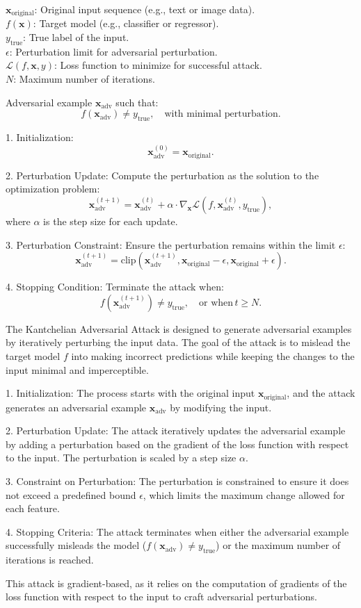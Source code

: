 $\mathbf{x}_{\text{original}}$: Original input sequence (e.g., text or image data). \\
$f(\mathbf{x})$: Target model (e.g., classifier or regressor). \\
$y_{\text{true}}$: True label of the input. \\
$\epsilon$: Perturbation limit for adversarial perturbation. \\
$\mathcal{L}(f, \mathbf{x}, y)$: Loss function to minimize for successful attack. \\
$N$: Maximum number of iterations.

Adversarial example $\mathbf{x}_{\text{adv}}$ such that:
\[
f(\mathbf{x}_{\text{adv}}) \neq y_{\text{true}}, \quad \text{with minimal perturbation}.
\]

1. Initialization:
   \[
   \mathbf{x}_{\text{adv}}^{(0)} = \mathbf{x}_{\text{original}}.
   \]

2. Perturbation Update:
   Compute the perturbation as the solution to the optimization problem:
   \[
   \mathbf{x}_{\text{adv}}^{(t+1)} = \mathbf{x}_{\text{adv}}^{(t)} + \alpha \cdot \nabla_{\mathbf{x}} \mathcal{L}(f, \mathbf{x}_{\text{adv}}^{(t)}, y_{\text{true}}),
   \]
   where $\alpha$ is the step size for each update.

3. Perturbation Constraint:
   Ensure the perturbation remains within the limit $\epsilon$:
   \[
   \mathbf{x}_{\text{adv}}^{(t+1)} = \text{clip}(\mathbf{x}_{\text{adv}}^{(t+1)}, \mathbf{x}_{\text{original}} - \epsilon, \mathbf{x}_{\text{original}} + \epsilon).
   \]

4. Stopping Condition:
   Terminate the attack when:
   \[
   f(\mathbf{x}_{\text{adv}}^{(t+1)}) \neq y_{\text{true}}, \quad \text{or when} \, t \geq N.
   \]

The Kantchelian Adversarial Attack is designed to generate adversarial examples by iteratively perturbing the input data. The goal of the attack is to mislead the target model $f$ into making incorrect predictions while keeping the changes to the input minimal and imperceptible.

1. Initialization: The process starts with the original input $\mathbf{x}_{\text{original}}$, and the attack generates an adversarial example $\mathbf{x}_{\text{adv}}$ by modifying the input.

2. Perturbation Update: The attack iteratively updates the adversarial example by adding a perturbation based on the gradient of the loss function with respect to the input. The perturbation is scaled by a step size $\alpha$.

3. Constraint on Perturbation: The perturbation is constrained to ensure it does not exceed a predefined bound $\epsilon$, which limits the maximum change allowed for each feature.

4. Stopping Criteria: The attack terminates when either the adversarial example successfully misleads the model ($f(\mathbf{x}_{\text{adv}}) \neq y_{\text{true}}$) or the maximum number of iterations is reached.

This attack is gradient-based, as it relies on the computation of gradients of the loss function with respect to the input to craft adversarial perturbations.
